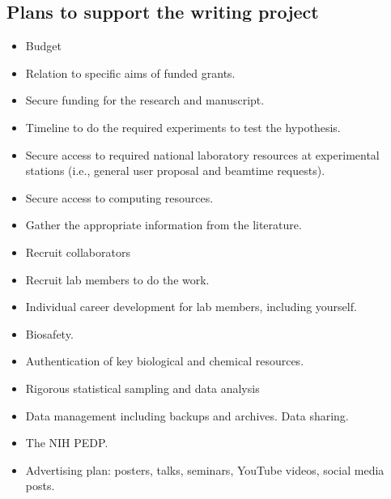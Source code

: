 \documentclass[10pt,letterpaper]{article}
\begin{document}
\subsection*{Plans to support the writing project}





\begin{itemize}
  \item Budget
  \item Relation to specific aims of funded grants.
  \item Secure funding for the research and manuscript.
  \item Timeline to do the required experiments to test the hypothesis. 
  \item Secure access to required national laboratory resources at experimental stations (i.e., general user proposal and beamtime requests).
  \item Secure access to computing resources.
  \item Gather the appropriate information from the literature.
  \item Recruit collaborators
  \item Recruit lab members to do the work.
  \item Individual career development for lab members, including yourself.
  \item Biosafety.
  \item Authentication of key biological and chemical resources.
  \item Rigorous statistical sampling and data analysis
  \item Data management including backups and archives.
  \itme Data sharing.
  \item The NIH PEDP.
  \item Advertising plan: posters, talks, seminars, YouTube videos, social media posts.
\end{itemize}
\end{document}
